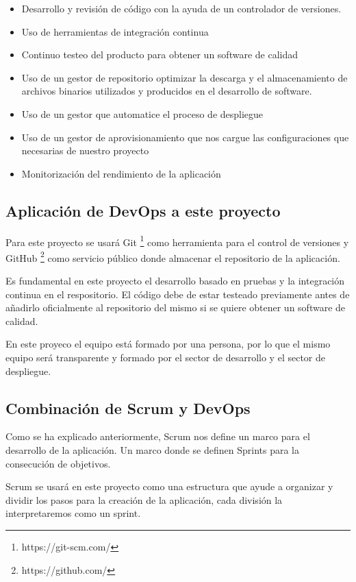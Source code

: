 \begin{itemize}
    \item Desarrollo y revisión de código con la ayuda de un controlador de versiones.
    \item Uso de herramientas de integración continua
    \item Continuo testeo del producto para obtener un software de calidad
    \item Uso de un gestor de repositorio optimizar la descarga y el almacenamiento de archivos binarios utilizados y producidos en el desarrollo de software.
    \item Uso de un gestor que automatice el proceso de despliegue
    \item Uso de un gestor de aprovisionamiento que nos cargue las configuraciones que necesarias de nuestro proyecto
    \item Monitorización del rendimiento de la aplicación
\end{itemize}

\subsection{Aplicación de DevOps a este proyecto}

Para este proyecto se usará Git \footnote{https://git-scm.com/} como herramienta para el control de versiones y GitHub \footnote{https://github.com/} como servicio público donde almacenar el repositorio de la aplicación.

Es fundamental en este proyecto el desarrollo basado en pruebas y la integración continua en el respositorio. El código debe de estar testeado previamente antes de añadirlo oficialmente al repositorio del mismo si se quiere obtener un software de calidad.

En este proyeco el equipo está formado por una persona, por lo que el mismo equipo será transparente y formado por el sector de desarrollo y el sector de despliegue.


\subsection{Combinación de Scrum y DevOps}

Como se ha explicado anteriormente, Scrum nos define un marco para el desarrollo de la aplicación. Un marco donde se definen Sprints para la consecución de objetivos.

Scrum se usará en este proyecto como una estructura que ayude a organizar y dividir los pasos para la creación de la aplicación, cada división la interpretaremos como un sprint.


